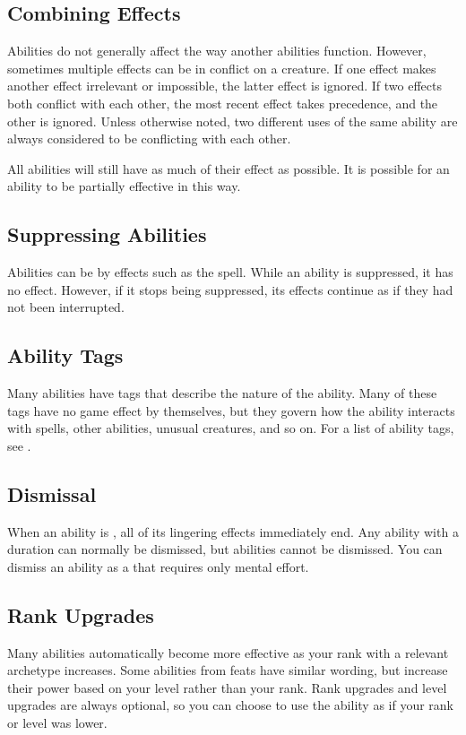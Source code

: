   \subsection{Combining Effects}
    Abilities do not generally affect the way another abilities function.
    However, sometimes multiple effects can be in conflict on a creature.
    If one effect makes another effect irrelevant or impossible, the latter effect is ignored.
    If two effects both conflict with each other, the most recent effect takes precedence, and the other is ignored.
    Unless otherwise noted, two different uses of the same ability are always considered to be conflicting with each other.

    All abilities will still have as much of their effect as possible.
    It is possible for an ability to be partially effective in this way.

  \subsection{Suppressing Abilities}\label{Suppressing Abilities}
    Abilities can be  by effects such as the  spell.
    While an ability is suppressed, it has no effect.
    However, if it stops being suppressed, its effects continue as if they had not been interrupted.

  \subsection{Ability Tags}
    Many abilities have tags that describe the nature of the ability.
    Many of these tags have no game effect by themselves, but they govern how the ability interacts with spells, other abilities, unusual creatures, and so on.
    For a list of ability tags, see .

  \subsection{Dismissal}\label{Dismissal}
    When an ability is , all of its lingering effects immediately end.
    Any \magical ability with a duration can normally be dismissed, but  abilities cannot be dismissed.
    You can dismiss an ability as a  that requires only mental effort.

  \subsection{Rank Upgrades}
    Many abilities automatically become more effective as your rank with a relevant archetype increases.
    Some abilities from feats have similar wording, but increase their power based on your level rather than your rank.
    Rank upgrades and level upgrades are always optional, so you can choose to use the ability as if your rank or level was lower.

